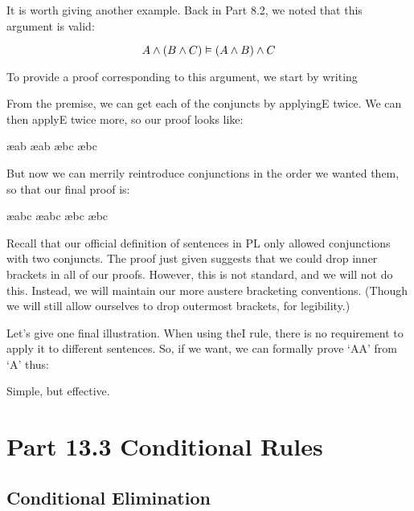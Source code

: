 It is worth giving another example. Back in Part 8.2, we noted that this argument is valid:

$$A\wedge (B\wedge C) \vDash (A\wedge B)\wedge C$$

To provide a proof corresponding to this argument, we start by writing
\begin{fitchproof}
\end{fitchproof}
From the premise, we can get each of the conjuncts by applying\eand E twice. We can then apply\eand E twice more, so our proof looks like:
\begin{fitchproof}
 \ae{ab}
 \ae{ab}
 \ae{bc}
 \ae{bc}
\end{fitchproof}
But now we can merrily reintroduce conjunctions in the order we wanted them, so that our final proof is:
\begin{fitchproof}
 \ae{abc}
 \ae{abc}
 \ae{bc}
 \ae{bc}
\end{fitchproof}

Recall that our official definition of sentences in PL only allowed conjunctions with two conjuncts. The proof just given suggests that we could drop inner brackets in all of our proofs. However, this is not standard, and we will not do this. Instead, we will maintain our more austere bracketing conventions. (Though we will still allow ourselves to drop outermost brackets, for legibility.)

Let’s give one final illustration. When using the\eand I rule, there is no requirement to apply it to different sentences. So, if we want, we can formally prove ‘A\eand  A’ from ‘A’ thus:

\begin{fitchproof}
\end{fitchproof}
Simple, but effective.

\section{Part 13.3 Conditional Rules}

\subsection{Conditional Elimination}

